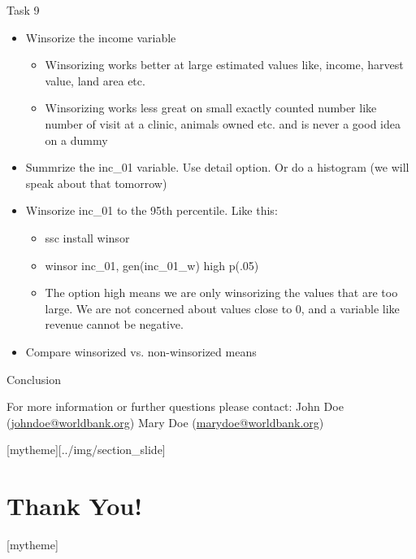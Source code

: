 \documentclass[aspectratio=169]{beamer}
\newcommand{\sectionpic}[2]{
	\setbeamertemplate{section page}[mytheme][#2]
	\section{#1}
	\setbeamertemplate{section page}[mytheme]
}
\begin{document}
\begin{frame}{Task 9}
\begin{itemize}
	\item Winsorize the income variable
		\begin{itemize}
			\item 	Winsorizing works better at large estimated values like, income, harvest value, land area etc.
			\item 	Winsorizing works less great on small exactly counted number like number of visit at a clinic, animals owned etc. and is never a good idea on a dummy
		\end{itemize}
	\item Summrize the inc\_01 variable. Use detail option. Or do a histogram (we will speak about that tomorrow)
	\item Winsorize inc\_01 to the 95th percentile. Like this:
		\begin{itemize}
			\item 	ssc install winsor
			\item winsor inc\_01, gen(inc\_01\_w) high p(.05)
			\item The option high means we are only winsorizing the values that are too large. We are not concerned about values close to 0, and a variable like revenue cannot be negative.
		\end{itemize}
	\item Compare winsorized vs. non-winsorized means
\end{itemize}
\end{frame}
	
\begin{frame}{Conclusion}


\vspace{20mm}
For more information or further questions please contact:
\newline John Doe (\url{johndoe@worldbank.org}) \newline Mary Doe (\url{marydoe@worldbank.org})

\end{frame}

\sectionpic{Thank You!}{../img/section_slide}
\end{document}
